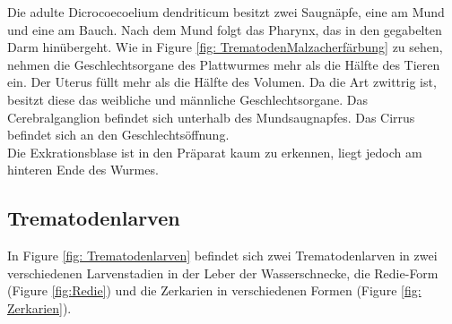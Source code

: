 \documentclass[oneside,10pt,a4paper]{report}
\begin{document}
				Die adulte Dicrocoecoelium dendriticum besitzt zwei Saugnäpfe, eine am Mund und eine am Bauch. Nach dem Mund folgt das Pharynx, das in den gegabelten Darm hinübergeht. Wie in Figure \ref{fig: TrematodenMalzacherfärbung} zu sehen, nehmen die Geschlechtsorgane des Plattwurmes mehr als die Hälfte des Tieren ein. Der Uterus füllt mehr als die Hälfte des Volumen. Da die Art zwittrig ist, besitzt diese das weibliche und männliche Geschlechtsorgane. Das Cerebralganglion befindet sich unterhalb des Mundsaugnapfes. Das Cirrus befindet sich an den Geschlechtsöffnung.\\
				Die Exkrationsblase ist in den Präparat kaum zu erkennen, liegt jedoch am hinteren Ende des Wurmes.
				
			\subsection{Trematodenlarven}
				In Figure \ref{fig: Trematodenlarven} befindet sich zwei Trematodenlarven in zwei verschiedenen Larvenstadien in der Leber der Wasserschnecke, die Redie-Form (Figure \ref{fig:Redie}) und die Zerkarien in verschiedenen Formen (Figure \ref{fig: Zerkarien}).
				
\end{document}
